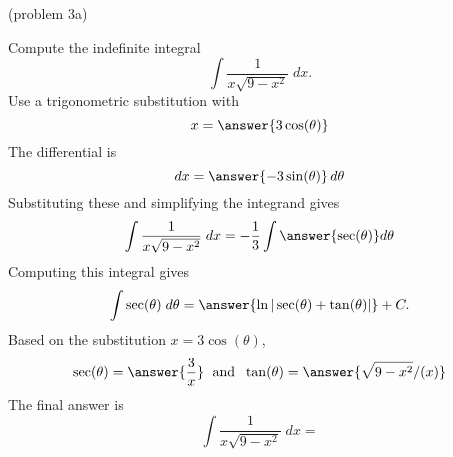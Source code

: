 \documentclass{ximera}
\begin{document}
\begin{problem}(problem 3a)

Compute the indefinite integral
\[
\int \frac{1}{x\sqrt{9-x^2}}  \; dx.
\]
Use a trigonometric substitution with\\
\[
x = \answer{3\cos(\theta)}
\]
The differential is\\
\[
dx = \answer{-3\sin(\theta)}\,d\theta
\]
Substituting these and simplifying the integrand gives\\
\[
\int \frac{1}{x\sqrt{9-x^2}}  \; dx = -\frac13\int \answer{\sec(\theta)} d\theta
\]
Computing this integral gives
\[
\int \sec(\theta) \; d\theta = \answer{\ln|\sec(\theta) + \tan(\theta)|} + C.
\]
Based on the substitution $x = 3 \cos(\theta)$, \\
\[
\sec(\theta) = \answer{\frac{3}{x}} \; \text{ and } \; \tan(\theta) = \answer{\sqrt{9-x^2}/(x)}
\]
The final answer is
\[
\int  \frac{1}{x\sqrt{9-x^2}}  \; dx = 
\]
\begin{center}
\begin{multipleChoice}
\end{multipleChoice}
\end{center}

\end{problem}
\end{document}
